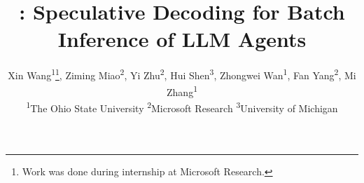 \documentclass{article}
\title{\sysname:  Speculative Decoding for Batch Inference of LLM Agents}
\author{
    Xin Wang\textsuperscript{1}\thanks{Work was done during internship at Microsoft Research.}, Ziming Miao\textsuperscript{2}, Yi Zhu\textsuperscript{2}, Hui Shen\textsuperscript{3}, Zhongwei Wan\textsuperscript{1}, Fan Yang\textsuperscript{2}, Mi Zhang\textsuperscript{1} \\
    \textsuperscript{1}The Ohio State University \quad
    \textsuperscript{2}Microsoft Research \quad \textsuperscript{3}University of Michigan
}
\begin{document}
\maketitle
\begin{abstract}

\end{abstract}














%




% 


%
\appendix

\end{document}
